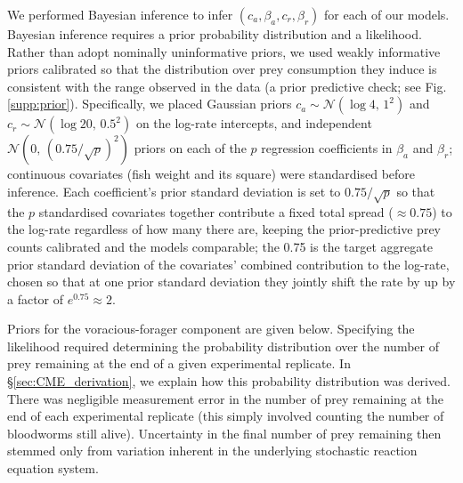 \documentclass[ASNA,twocolumn]{USG} %
\begin{document}
We performed Bayesian inference to infer \begin{math} (c_a, \beta_a, c_r, \beta_r)\end{math} for each of our models. Bayesian inference requires a prior probability distribution and a likelihood. Rather than adopt nominally uninformative priors, we used weakly informative priors calibrated so that the distribution over prey consumption they induce is consistent with the range observed in the data (a prior predictive check; see Fig. \ref{supp:prior}). Specifically, we placed Gaussian priors \begin{math}c_a \sim \mathcal{N}(\log 4,\, 1^2)\end{math} and \begin{math}c_r \sim \mathcal{N}(\log 20,\, 0.5^2)\end{math} on the log-rate intercepts, and independent \begin{math}\mathcal{N}(0,\, (0.75/\sqrt{p})^2)\end{math} priors on each of the \begin{math}p\end{math} regression coefficients in \begin{math}\beta_a\end{math} and \begin{math}\beta_r\end{math}; continuous covariates (fish weight and its square) were standardised before inference.  Each coefficient's prior standard deviation is set to $0.75/\sqrt{p}$ so that the $p$ standardised covariates together contribute a fixed total spread ($\approx 0.75$) to the log-rate regardless of how many there are, keeping the prior-predictive prey counts calibrated and the models comparable; the 0.75 is the target aggregate prior standard deviation of the covariates' combined contribution to the log-rate, chosen so that at one prior standard deviation they jointly shift the rate by up by a factor of $e^{0.75}\approx 2$.

Priors for the voracious-forager component are given below. Specifying the likelihood required determining the probability distribution over the number of prey remaining at the end of a given experimental replicate. In \S\ref{sec:CME_derivation}, we explain how this probability distribution was derived. There was negligible measurement error in the number of prey remaining at the end of each experimental replicate (this simply involved counting the number of bloodworms still alive). Uncertainty in the final number of prey remaining then stemmed only from variation inherent in the underlying stochastic reaction equation system.  
\end{document}
